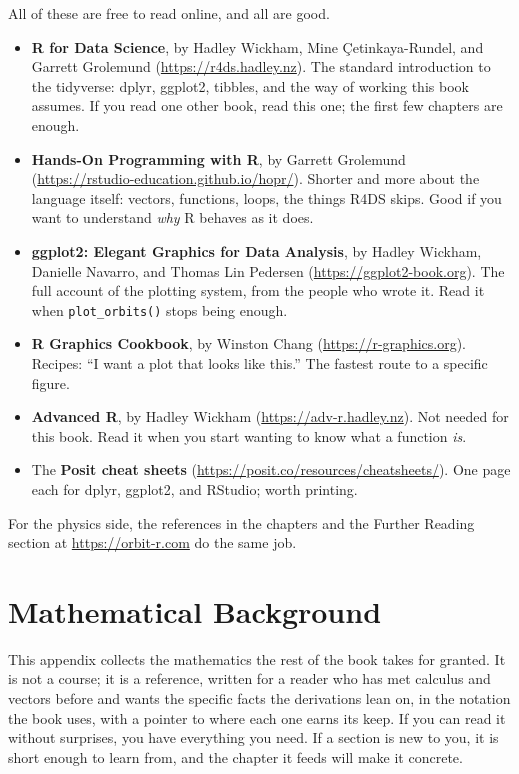 \documentclass[
  10.5pt,
  letterpaper,
]{scrbook}
\providecommand{\tightlist}{%
  \setlength{\itemsep}{0pt}\setlength{\parskip}{0pt}}
\theoremstyle{plain}
\theoremstyle{remark}
\begin{document}
All of these are free to read online, and all are good.

\begin{itemize}
\tightlist
\item
  \textbf{R for Data Science}, by Hadley Wickham, Mine Çetinkaya-Rundel,
  and Garrett Grolemund (\url{https://r4ds.hadley.nz}). The standard
  introduction to the tidyverse: dplyr, ggplot2, tibbles, and the way of
  working this book assumes. If you read one other book, read this one;
  the first few chapters are enough.
\item
  \textbf{Hands-On Programming with R}, by Garrett Grolemund
  (\url{https://rstudio-education.github.io/hopr/}). Shorter and more
  about the language itself: vectors, functions, loops, the things R4DS
  skips. Good if you want to understand \emph{why} R behaves as it does.
\item
  \textbf{ggplot2: Elegant Graphics for Data Analysis}, by Hadley
  Wickham, Danielle Navarro, and Thomas Lin Pedersen
  (\url{https://ggplot2-book.org}). The full account of the plotting
  system, from the people who wrote it. Read it when
  \texttt{plot\_orbits()} stops being enough.
\item
  \textbf{R Graphics Cookbook}, by Winston Chang
  (\url{https://r-graphics.org}). Recipes: ``I want a plot that looks
  like this.'' The fastest route to a specific figure.
\item
  \textbf{Advanced R}, by Hadley Wickham
  (\url{https://adv-r.hadley.nz}). Not needed for this book. Read it
  when you start wanting to know what a function \emph{is}.
\item
  The \textbf{Posit cheat sheets}
  (\url{https://posit.co/resources/cheatsheets/}). One page each for
  dplyr, ggplot2, and RStudio; worth printing.
\end{itemize}

For the physics side, the references in the chapters and the Further
Reading section at \url{https://orbit-r.com} do the same job.

\chapter{Mathematical Background}\label{sec-math}

This appendix collects the mathematics the rest of the book takes for
granted. It is not a course; it is a reference, written for a reader who
has met calculus and vectors before and wants the specific facts the
derivations lean on, in the notation the book uses, with a pointer to
where each one earns its keep. If you can read it without surprises, you
have everything you need. If a section is new to you, it is short enough
to learn from, and the chapter it feeds will make it concrete.
\end{document}
